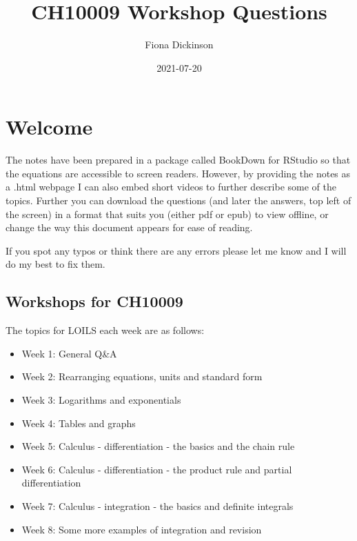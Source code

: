 \documentclass[
]{book}
\title{CH10009 Workshop Questions}
\author{Fiona Dickinson}
\date{2021-07-20}
\providecommand{\tightlist}{%
  \setlength{\itemsep}{0pt}\setlength{\parskip}{0pt}}
\begin{document}
\maketitle

{
\setcounter{tocdepth}{1}
\tableofcontents
}
\hypertarget{welcome}{%
\chapter*{Welcome}\label{welcome}}

The notes have been prepared in a package called BookDown for RStudio so that the equations are accessible to screen readers. However, by providing the notes as a .html webpage I can also embed short videos to further describe some of the topics. Further you can download the questions (and later the answers, top left of the screen) in a format that suits you (either pdf or epub) to view offline, or change the way this document appears for ease of reading.

If you spot any typos or think there are any errors please let me know and I will do my best to fix them.

\hypertarget{workshops-for-ch10009}{%
\section*{Workshops for CH10009}\label{workshops-for-ch10009}}

The topics for LOILS each week are as follows:

\begin{itemize}
\tightlist
\item
  Week 1: General Q\&A
\item
  Week 2: Rearranging equations, units and standard form
\item
  Week 3: Logarithms and exponentials
\item
  Week 4: Tables and graphs
\item
  Week 5: Calculus - differentiation - the basics and the chain rule
\item
  Week 6: Calculus - differentiation - the product rule and partial differentiation
\item
  Week 7: Calculus - integration - the basics and definite integrals
\item
  Week 8: Some more examples of integration and revision
\end{itemize}
\end{document}

